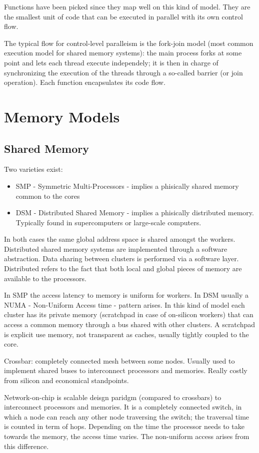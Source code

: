 Functions have been picked since they map well on this kind of model. They are the smallest unit of code that can be executed in parallel with its own control flow.

The typical flow for control-level paralleism is the fork-join model (most common execution model for shared memory systems):
the main process forks at some point and lets each thread execute independely;
it is then in charge of synchronizing the execution of the threads through a so-called barrier (or join operation). Each function encapsulates its code flow.

\section{Memory Models}
\subsection{Shared Memory}
Two varieties exist:
\begin{itemize}
  \item SMP - Symmetric Multi-Processors - implies a phisically shared memory common to the cores
  \item DSM - Distributed Shared Memory - implies a phisically distributed memory. Typically found in supercomputers or large-scale computers.
\end{itemize}

In both cases the same global address space is shared amongst the workers.
Distributed shared memory systems are implemented through a software abstraction. Data sharing between clusters is performed via a software layer.
Distributed refers to the fact that both local and global pieces of memory are available to the processors.

In SMP the access latency to memory is uniform for workers. In DSM usually a NUMA - Non-Uniform Access time - pattern arises.
In this kind of model each cluster has its private memory (scratchpad in case of on-silicon workers) that can access a common memory through a bus shared with other clusters.
A scratchpad is explicit use memory, not transparent as caches, usually tightly coupled to the core.

Crossbar: completely connected mesh between some nodes. Usually used to implement shared buses to interconnect processors and memories.
Really costly from silicon and economical standpoints.

Network-on-chip is scalable deisgn paridgm (compared to crossbars) to interconnect processors and memories.
It is a completely connected switch, in which a node can reach any other node traversing the switch; the traversal time is counted in term of hops.
Depending on the time the processor needs to take towards the memory, the access time varies. The non-uniform access arises from this difference.


